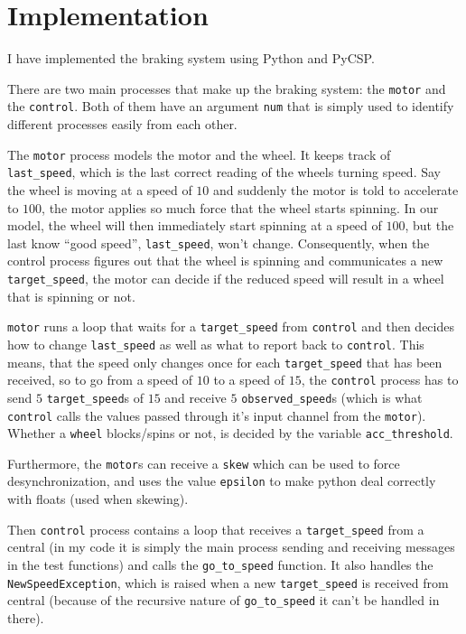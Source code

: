 \documentclass[a4paper, 10pt]{article}
\begin{document}
\maketitle

\newpage

\section{Implementation}

I have implemented the braking system using Python and PyCSP. 

There are two main processes that make up the braking system: the
\verb+motor+ and the \verb+control+. Both of them have an argument \verb+num+ that
is simply used to identify different processes easily from each other.

The \verb+motor+ process models the motor and the wheel. It keeps track of
\verb+last_speed+, which is the last correct reading of the wheels
turning speed. Say the wheel is moving at a speed of $10$ and suddenly
the motor is told to accelerate to $100$, the motor applies so much
force that the wheel starts spinning. In our model, the wheel will
then immediately start spinning at a speed of $100$, but the last know
``good speed'', \verb+last_speed+, won't change. Consequently, when
the control process figures out that the wheel is spinning and
communicates a new \verb+target_speed+, the motor can decide if the
reduced speed will result in a wheel that is spinning or not. 

\verb+motor+ runs a loop that waits for a \verb+target_speed+ from
\verb+control+ and then decides how to change \verb+last_speed+ as
well as what to report back to \verb+control+. This means, that the
speed only changes once for each \verb+target_speed+ that has been
received, so to go from a speed of $10$ to a speed of $15$, the
\verb+control+ process has to send $5$ \verb+target_speed+s of $15$
and receive $5$ \verb+observed_speed+s (which is what \verb+control+
calls the values passed through it's input channel from the
\verb+motor+). Whether a \verb+wheel+ blocks/spins or not, is decided
by the variable \verb+acc_threshold+.

Furthermore, the \verb+motor+s can receive a \verb+skew+ which can be
used to force desynchronization, and uses the value \verb+epsilon+ to
make python deal correctly with floats (used when skewing).

Then \verb+control+ process contains a loop that receives a
\verb+target_speed+ from a central (in my code it is simply the
main process sending and receiving messages in the test functions) and
calls the \verb+go_to_speed+ function. It also handles the
\verb+NewSpeedException+, which is raised when a new
\verb+target_speed+ is received from central (because of the recursive
nature of \verb+go_to_speed+ it can't be handled in there).
\end{document}
